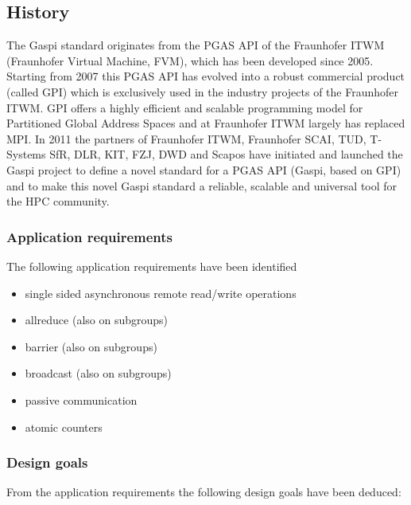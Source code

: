 \documentclass{article}
\newlength{\st}\setlength{\st}{0pt}
\newcommand{\GASPI}{{\sc Gaspi}}
\begin{document}
\subsection{History}
The \GASPI{} standard originates from the PGAS API of the Fraunhofer ITWM (Fraunhofer Virtual Machine, FVM), 
which has been developed since 2005. Starting from 2007 this PGAS API has evolved into a robust commercial 
product (called GPI) which is exclusively used in the industry projects of the Fraunhofer ITWM. GPI offers a 
highly efficient and scalable programming model for Partitioned Global Address Spaces and at Fraunhofer ITWM 
largely has replaced MPI. In 2011 the partners of Fraunhofer ITWM, Fraunhofer SCAI, TUD, T-Systems SfR, DLR, KIT,
 FZJ, DWD and Scapos have initiated and launched the \GASPI{} project to define a novel standard for a PGAS API 
(\GASPI{}, based on GPI) and to make this novel \GASPI{} standard a reliable, scalable and universal tool for the
 HPC community. 

\subsubsection{Application requirements}

The following application requirements have been identified

\begin{itemize}
\item single sided asynchronous remote read/write operations
\item allreduce (also on subgroups)
\item barrier (also on subgroups)
\item broadcast (also on subgroups)
\item passive communication
\item atomic counters
\end{itemize}


\subsubsection{Design goals}

From the application requirements the following design goals have been deduced:
\end{document}
